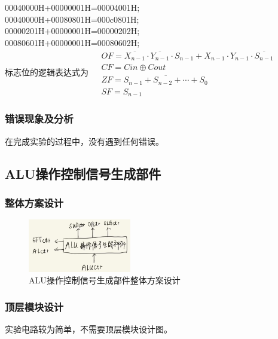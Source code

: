 \documentclass{article}
\begin{document}
    00040000H+00000001H=00004001H;\\
    00040000H+00080801H=000c0801H;\\
    00000201H+00000001H=00000202H;\\
    00080601H+00000001H=00080602H;\\
    标志位的逻辑表达式为
    $\begin{aligned}
        &OF =\overline{X_{n-1}}\cdot\overline{Y_{n-1}}\cdot S_{n-1}+X_{n-1}\cdot Y_{n-1}\cdot\overline{S_{n-1}}  \\
        &CF =Cin\oplus Cout  \\
        &ZF =\overline{S_{n-1}+S_{n-2}+\cdots+S_0}  \\
        &SF =S_{n-1} 
    \end{aligned}$
    
    \subsubsection{错误现象及分析}
    在完成实验的过程中，没有遇到任何错误。

    \subsection{ALU操作控制信号生成部件}
    \subsubsection{整体方案设计}
    \begin{figure}[H]
    \centering
    \includegraphics[width=0.4\textwidth]{5.1.png}
    \caption{ALU操作控制信号生成部件整体方案设计}
    \end{figure}

    \subsubsection{顶层模块设计}
    实验电路较为简单，不需要顶层模块设计图。
\end{document}
